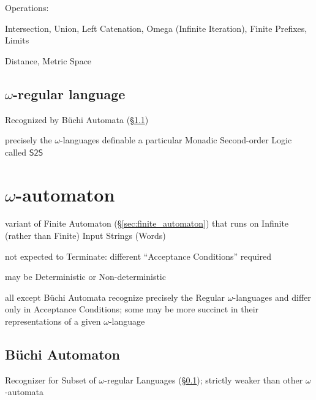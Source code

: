 Operations:

Intersection, Union, Left Catenation, Omega (Infinite Iteration),
Finite Prefixes, Limits

Distance, Metric Space %



\subsection{$\omega$-regular language}\label{sec:omega_regular}

Recognized by B\"uchi Automata (\S\ref{sec:buchi_automaton})

precisely the $\omega$-languages definable a particular Monadic
Second-order Logic called $\mathsf{S2S}$



\section{$\omega$-automaton}\label{sec:omega_automaton}

variant of Finite Automaton (\S\ref{sec:finite_automaton}) that runs
on Infinite (rather than Finite) Input Strings (Words)

not expected to Terminate: different ``Acceptance Conditions''
required %

may be Deterministic or Non-deterministic

all except B\"uchi Automata recognize precisely the Regular
$\omega$-languages and differ only in Acceptance Conditions; some may
be more succinct in their representations of a given $\omega$-language



\subsection{B\"uchi Automaton}\label{sec:buchi_automaton}

Recognizer for Subset of $\omega$-regular Languages
(\S\ref{sec:omega_regular}); strictly weaker than other
$\omega$-automata


